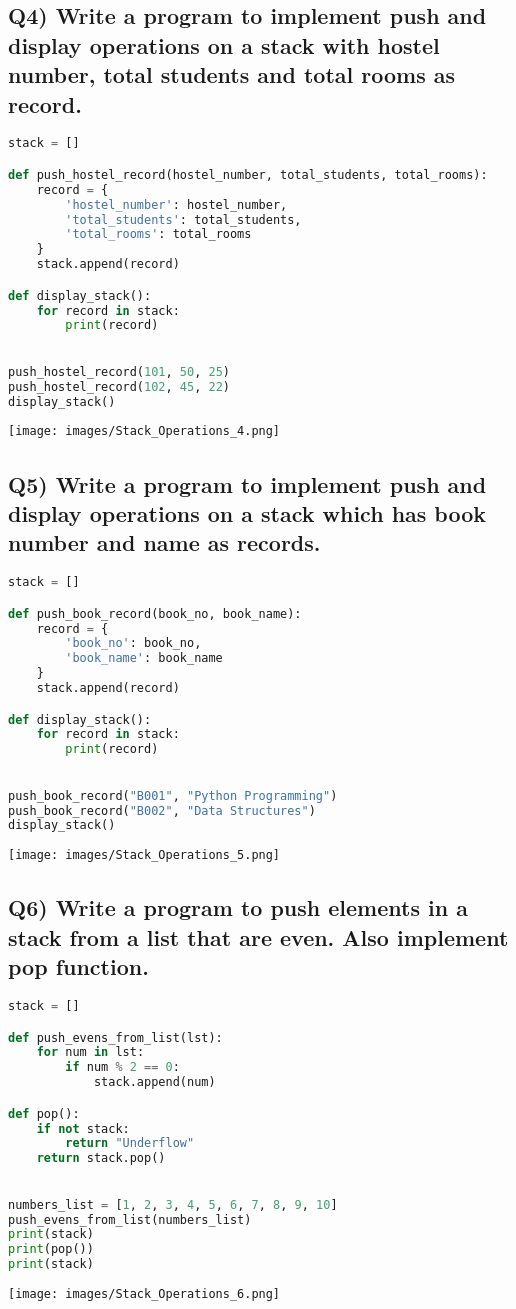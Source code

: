 \documentclass{article}
\begin{document}
\subsection*{Q4) Write a program to implement push and display operations on a stack with hostel number, total students and total rooms as record.}
\begin{lstlisting}[language=Python]
stack = []

def push_hostel_record(hostel_number, total_students, total_rooms):
    record = {
        'hostel_number': hostel_number,
        'total_students': total_students,
        'total_rooms': total_rooms
    }
    stack.append(record)

def display_stack():
    for record in stack:
        print(record)

 
push_hostel_record(101, 50, 25)
push_hostel_record(102, 45, 22)
display_stack()
\end{lstlisting}
\texttt{[image: images/Stack\_Operations\_4.png]}

\subsection*{Q5) Write a program to implement push and display operations on a stack which has book number and name as records.}
\begin{lstlisting}[language=Python]
stack = []

def push_book_record(book_no, book_name):
    record = {
        'book_no': book_no,
        'book_name': book_name
    }
    stack.append(record)

def display_stack():
    for record in stack:
        print(record)

 
push_book_record("B001", "Python Programming")
push_book_record("B002", "Data Structures")
display_stack()
\end{lstlisting}
\texttt{[image: images/Stack\_Operations\_5.png]}

\subsection*{Q6) Write a program to push elements in a stack from a list that are even. Also implement pop function.}
\begin{lstlisting}[language=Python]
stack = []

def push_evens_from_list(lst):
    for num in lst:
        if num % 2 == 0:
            stack.append(num)

def pop():
    if not stack:
        return "Underflow"
    return stack.pop()

 
numbers_list = [1, 2, 3, 4, 5, 6, 7, 8, 9, 10]
push_evens_from_list(numbers_list)
print(stack)
print(pop())
print(stack)
\end{lstlisting}
\texttt{[image: images/Stack\_Operations\_6.png]}
\end{document}
